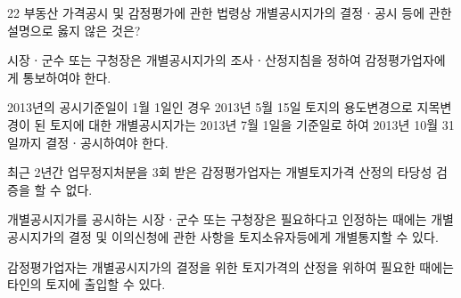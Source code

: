 \begin{question}{22}
부동산 가격공시 및 감정평가에 관한 법령상 개별공시지가의 결정ㆍ공시 등에 관한 설명으로 옳지 않은 것은?
\begin{choices}
  \item 시장ㆍ군수 또는 구청장은 개별공시지가의 조사ㆍ산정지침을 정하여 감정평가업자에게 통보하여야 한다.
  \item 2013년의 공시기준일이 1월 1일인 경우 2013년 5월 15일 토지의 용도변경으로 지목변경이 된 토지에 대한 개별공시지가는 2013년 7월 1일을 기준일로 하여 2013년 10월 31일까지 결정ㆍ공시하여야 한다.
  \item 최근 2년간 업무정지처분을 3회 받은 감정평가업자는 개별토지가격 산정의 타당성 검증을 할 수 없다.
  \item 개별공시지가를 공시하는 시장ㆍ군수 또는 구청장은 필요하다고 인정하는 때에는 개별공시지가의 결정 및 이의신청에 관한 사항을 토지소유자등에게 개별통지할 수 있다.
  \item 감정평가업자는 개별공시지가의 결정을 위한 토지가격의 산정을 위하여 필요한 때에는 타인의 토지에 출입할 수 있다.
\end{choices}
\end{question}
